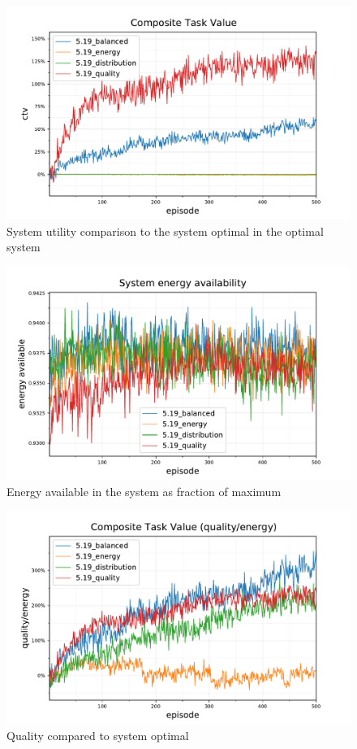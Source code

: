 
\begin{figure}[ht]
	\centering
	\includegraphics[width=0.7\linewidth]{5_ctv-ctv}
	\captionsetup{labelfont=bf,singlelinecheck=on}
	\caption{System utility comparison to the system optimal in the optimal system}
	\label{fig:5_ctv-ctv}
\end{figure}
\begin{figure}[ht]
	\centering
	\includegraphics[width=0.7\linewidth]{5_ctv-statistics-energy-available}
	\captionsetup{labelfont=bf,singlelinecheck=on}
	\caption{Energy available in the system as fraction of maximum}
	\label{fig:5_ctv-statistics-energy-available}
\end{figure}
\begin{figure}[ht]
	\centering
	\includegraphics[width=0.8\linewidth]{5_ctv-quality-energy}
	\captionsetup{labelfont=bf,singlelinecheck=on}
	\caption{Quality compared to system optimal}
	\label{fig:5_ctv-quality-energy}
\end{figure}

